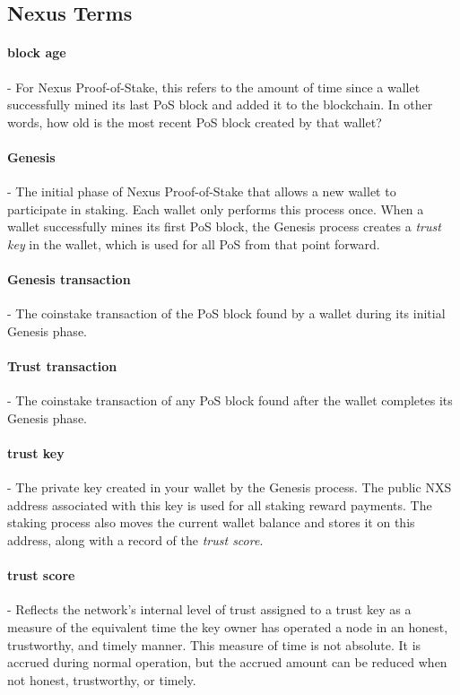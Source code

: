 \documentclass[11pt]{article}
\begin{document}
\subsection{Nexus Terms}

\paragraph{block age}- For Nexus Proof-of-Stake, this refers to the amount of time since a wallet successfully mined its last PoS block and added it to the blockchain. In other words, how old is the most recent PoS block created by that wallet? 

\paragraph{Genesis}- The initial phase of Nexus Proof-of-Stake that allows a new wallet to participate in staking. Each wallet only performs this process once. When a wallet successfully mines its first PoS block, the Genesis process creates a \textit{trust key} in the wallet, which is used for all PoS from that point forward.

\paragraph{Genesis transaction}- The coinstake transaction of the PoS block found by a wallet during its initial Genesis phase.

\paragraph{Trust transaction}- The coinstake transaction of any PoS block found after the wallet completes its Genesis phase. 

\paragraph{trust key}- The private key created in your wallet by the Genesis process. The public NXS address associated with this key is used for all staking reward payments. The staking process also moves the current wallet balance and stores it on this address, along with a record of the \textit{trust score}.

\paragraph{trust score}- Reflects the network’s internal level of trust assigned to a trust key as a measure of the equivalent time the key owner has operated a node in an honest, trustworthy, and timely manner. This measure of time is not absolute. It is accrued during normal operation, but the accrued amount can be reduced when not honest, trustworthy, or timely.
\end{document}
